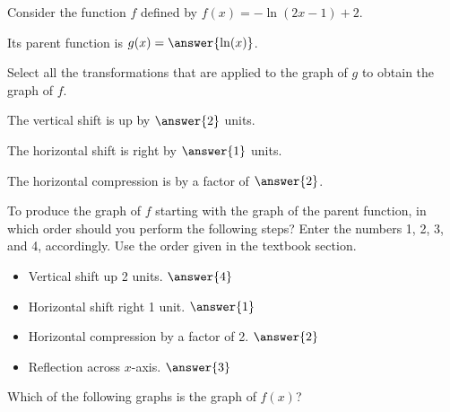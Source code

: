 \documentclass{ximera}
\author{Kenneth Berglund}
\begin{document}
\begin{exercise}
Consider the function $f$ defined by $f(x) = -\ln(2x - 1) + 2$.

Its parent function is $g(x) = \answer{\ln(x)}$. 

\begin{exercise}
Select all the transformations that are applied to the graph of $g$ to obtain the graph of $f$.
\begin{selectAll}
\end{selectAll}

\begin{exercise}
The vertical shift is up by $\answer{2}$ units.

The horizontal shift is right by $\answer{1}$ units.


The horizontal compression is by a factor of $\answer{2}$.

\begin{exercise}
To produce the graph of $f$ starting with the graph of the parent function, in which order should you perform the following steps? Enter the numbers 1, 2, 3, and 4, accordingly. Use the order given in the textbook section.
\begin{itemize}
\item Vertical shift up 2 units. $\answer{4}$
\item Horizontal shift right 1 unit. $\answer{1}$
\item Horizontal compression by a factor of 2. $\answer{2}$
\item Reflection across $x$-axis. $\answer{3}$
\end{itemize}
Which of the following graphs is the graph of $f(x)$?


\end{exercise}
\end{exercise}
\end{exercise}
\end{exercise}
\end{document}
